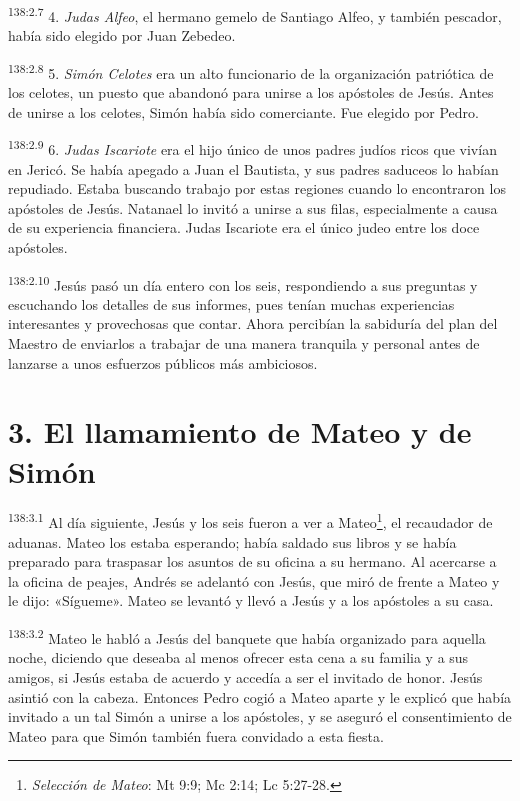 \par
\textsuperscript{138:2.7} 4. \textit{Judas Alfeo}, el hermano gemelo de Santiago Alfeo, y también pescador, había sido elegido por Juan Zebedeo.

\par
\textsuperscript{138:2.8} 5. \textit{Simón Celotes} era un alto funcionario de la organización patriótica de los celotes, un puesto que abandonó para unirse a los apóstoles de Jesús. Antes de unirse a los celotes, Simón había sido comerciante. Fue elegido por Pedro.

\par
\textsuperscript{138:2.9} 6. \textit{Judas Iscariote} era el hijo único de unos padres judíos ricos que vivían en Jericó. Se había apegado a Juan el Bautista, y sus padres saduceos lo habían repudiado. Estaba buscando trabajo por estas regiones cuando lo encontraron los apóstoles de Jesús. Natanael lo invitó a unirse a sus filas, especialmente a causa de su experiencia financiera. Judas Iscariote era el único judeo entre los doce apóstoles.

\par
\textsuperscript{138:2.10} Jesús pasó un día entero con los seis, respondiendo a sus preguntas y escuchando los detalles de sus informes, pues tenían muchas experiencias interesantes y provechosas que contar. Ahora percibían la sabiduría del plan del Maestro de enviarlos a trabajar de una manera tranquila y personal antes de lanzarse a unos esfuerzos públicos más ambiciosos.

\section*{3. El llamamiento de Mateo y de Simón}
\par
\textsuperscript{138:3.1} Al día siguiente, Jesús y los seis fueron a ver a Mateo\footnote{\textit{Selección de Mateo}: Mt 9:9; Mc 2:14; Lc 5:27-28.}, el recaudador de aduanas. Mateo los estaba esperando; había saldado sus libros y se había preparado para traspasar los asuntos de su oficina a su hermano. Al acercarse a la oficina de peajes, Andrés se adelantó con Jesús, que miró de frente a Mateo y le dijo: «Sígueme». Mateo se levantó y llevó a Jesús y a los apóstoles a su casa.

\par
\textsuperscript{138:3.2} Mateo le habló a Jesús del banquete que había organizado para aquella noche, diciendo que deseaba al menos ofrecer esta cena a su familia y a sus amigos, si Jesús estaba de acuerdo y accedía a ser el invitado de honor. Jesús asintió con la cabeza. Entonces Pedro cogió a Mateo aparte y le explicó que había invitado a un tal Simón a unirse a los apóstoles, y se aseguró el consentimiento de Mateo para que Simón también fuera convidado a esta fiesta.

